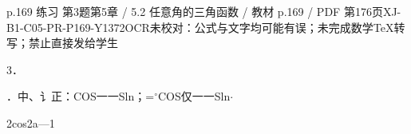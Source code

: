 \begin{bankitem}{p.169 练习 第3题}{第5章 / 5.2 任意角的三角函数 / 教材 p.169 / PDF 第176页}{XJ-B1-C05-PR-P169-Y1372}{OCR未校对：公式与文字均可能有误；未完成数学TeX转写；禁止直接发给学生}
\begin{ocrdraft}
\par
3．
\par
．中、讠正：COS一一Sln；=\ensuremath{{}^\circ\mathrm C}OS仅一一Sln\ensuremath{\cdot}
\par
2cos2a—1
\end{ocrdraft}
\end{bankitem}
